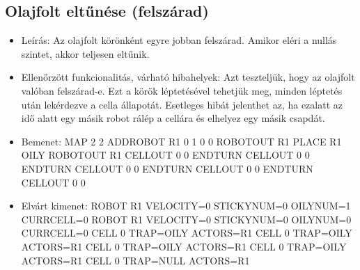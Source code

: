 \subsection{Olajfolt eltűnése (felszárad)}
\begin{itemize}
	\item Leírás: \newline
	Az olajfolt körönként egyre jobban felszárad. Amikor eléri a nullás szintet, akkor teljesen eltűnik. 
	\item Ellenőrzött funkcionalitás, várható hibahelyek: \newline 
	 Azt teszteljük, hogy az olajfolt valóban felszárad-e. Ezt a körök léptetésével tehetjük meg, minden léptetés után lekérdezve a cella állapotát.
	 Esetleges hibát jelenthet az, ha ezalatt az idő alatt egy másik robot rálép a cellára és elhelyez egy másik csapdát.
	\item Bemenet: \newline
	MAP 2 2 \newline
	ADDROBOT R1 0 1 0 0 \newline
	ROBOTOUT R1 \newline
	PLACE R1 OILY \newline
	ROBOTOUT R1 \newline
	CELLOUT 0 0 \newline
	ENDTURN \newline
	CELLOUT 0 0 \newline
	ENDTURN \newline
	CELLOUT 0 0 \newline
	ENDTURN \newline
	CELLOUT 0 0 \newline
	ENDTURN \newline
	CELLOUT 0 0 \newline
	\item Elvárt kimenet: \newline
	ROBOT R1 VELOCITY=0 STICKYNUM=0 OILYNUM=1 CURRCELL=0
	\newline
	ROBOT R1 VELOCITY=0 STICKYNUM=0 OILYNUM=0 
	CURRCELL=0
	CELL 0 TRAP=OILY ACTORS=R1
	\newline
	CELL 0 TRAP=OILY ACTORS=R1
	\newline
	CELL 0 TRAP=OILY ACTORS=R1
	\newline
	CELL 0 TRAP=OILY ACTORS=R1
	\newline
	CELL 0 TRAP=NULL ACTORS=R1
\end{itemize}

